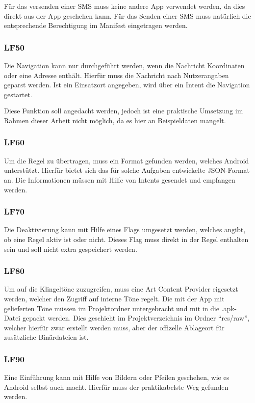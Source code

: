 F\"ur das versenden einer SMS muss keine andere App verwendet werden, da dies direkt aus der App geschehen kann. F\"ur das Senden einer SMS muss nat\"urlich die entsprechende Berechtigung im Manifest eingetragen werden.

\subsubsection{LF50}
Die Navigation kann nur durchgef\"uhrt werden, wenn die Nachricht Koordinaten oder eine Adresse enth\"alt. Hierf\"ur muss die Nachricht nach Nutzerangaben geparst werden. Ist ein Einsatzort angegeben, wird \"uber ein Intent die Navigation gestartet.

Diese Funktion soll angedacht werden, jedoch ist eine praktische Umsetzung im Rahmen dieser Arbeit nicht m\"oglich, da es hier an Beispieldaten mangelt.

\subsubsection{LF60}
Um die Regel zu \"ubertragen, muss ein Format gefunden werden, welches Android unterst\"utzt. Hierf\"ur bietet sich das f\"ur solche Aufgaben entwickelte JSON-Format an. Die Informationen m\"ussen mit Hilfe von Intents gesendet und empfangen werden.

\subsubsection{LF70}
Die Deaktivierung kann mit Hilfe eines Flags umgesetzt werden, welches angibt, ob eine Regel aktiv ist oder nicht. Dieses Flag muss direkt in der Regel enthalten sein und soll nicht extra gespeichert werden.

\subsubsection{LF80}
Um auf die Klingelt\"one zuzugreifen, muss eine Art Content Provider eigesetzt werden, welcher den Zugriff auf interne T\"one regelt. Die mit der App mit gelieferten T\"one m\"ussen im Projektordner untergebracht und mit in die .apk-Datei gepackt werden. Dies geschieht im Projektverzeichnis im Ordner "`res/raw"', welcher hierf\"ur zwar erstellt werden muss, aber der offizelle Ablageort f\"ur zus\"atzliche Bin\"ardateien ist.

\subsubsection{LF90}
Eine Einf\"uhrung kann mit Hilfe von Bildern oder Pfeilen geschehen, wie es Android selbst auch macht. Hierf\"ur muss der praktikabelste Weg gefunden werden. 

